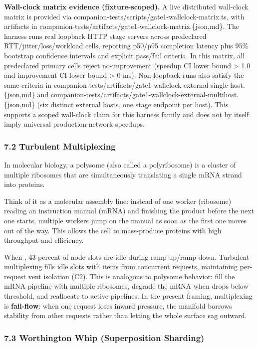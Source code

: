 \documentclass[
]{article}
\begin{document}
\textbf{Wall-clock matrix evidence (fixture-scoped).} A live distributed
wall-clock matrix is provided via
companion-tests/scripts/gate1-wallclock-matrix.ts, with artifacts in
companion-tests/artifacts/gate1-wallclock-matrix.\{json,md\}. The
harness runs real loopback HTTP stage servers across predeclared
RTT/jitter/loss/workload cells, reporting p50/p95 completion latency
plus 95\% bootstrap confidence intervals and explicit pass/fail
criteria. In this matrix, all predeclared primary cells reject
no-improvement (speedup CI lower bound \textgreater{} 1.0 and
improvement CI lower bound \textgreater{} 0 ms). Non-loopback runs also
satisfy the same criteria in
companion-tests/artifacts/gate1-wallclock-external-single-host.\{json,md\}
and
companion-tests/artifacts/gate1-wallclock-external-multihost.\{json,md\}
(six distinct external hosts, one stage endpoint per host). This
supports a scoped wall-clock claim for this harness family and does not
by itself imply universal production-network speedups.

\subsubsection{\texorpdfstring{\textbf{7.2 Turbulent
Multiplexing}}{7.2 Turbulent Multiplexing}}\label{turbulent-multiplexing}

In molecular biology, a polysome (also called a polyribosome) is a
cluster of multiple ribosomes that are simultaneously translating a
single mRNA strand into proteins.

Think of it as a molecular assembly line: instead of one worker
(ribosome) reading an instruction manual (mRNA) and finishing the
product before the next one starts, multiple workers jump on the manual
as soon as the first one moves out of the way. This allows the cell to
mass-produce proteins with high throughput and efficiency.

When , 43 percent of node-slots are idle during ramp-up/ramp-down.
Turbulent multiplexing fills idle slots with items from concurrent
requests, maintaining per-request vent isolation (C2). This is analogous
to polysome behavior: fill the mRNA pipeline with multiple ribosomes,
degrade the mRNA when drops below threshold, and reallocate to active
pipelines. In the present framing, multiplexing is \textbf{fail-flow}:
when one request loses inward pressure, the manifold borrows stability
from other requests rather than letting the whole surface sag outward.

\subsubsection{\texorpdfstring{\textbf{7.3 Worthington Whip
(Superposition
Sharding)}}{7.3 Worthington Whip (Superposition Sharding)}}\label{worthington-whip-superposition-sharding}
\end{document}
